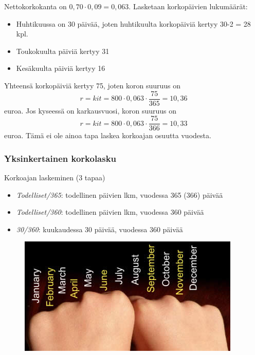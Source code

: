 \documentclass{beamer}
\begin{document}
\begin{frame}
    \begin{ratkaisu}
        Nettokorkokanta on \(0,70\cdot0,09 = 0,063\). Lasketaan korkopäivien lukumäärät:
        \begin{itemize}
            \item Huhtikuussa on 30 päivää, joten huhtikuulta korkopäiviä kertyy 30-2 = 28 kpl.
            \item Toukokuulta päiviä kertyy 31
            \item Kesäkuulta päiviä kertyy 16
        \end{itemize}
        Yhteensä korkopäiviä kertyy 75, joten koron suuruus on
        \[
            r = kit = 800\cdot 0,063\cdot \frac{75}{365} = 10,36
        \]
        euroa. Jos kyseessä on karkausvuosi, koron suuruus on
        \[
            r = kit = 800\cdot 0,063\cdot \frac{75}{366} = 10,33
        \]
        euroa. Tämä ei ole ainoa tapa laskea korkoajan osuutta vuodesta.
    \end{ratkaisu}
\end{frame}

\begin{frame}
    \frametitle{Yksinkertainen korkolasku}
    \begin{block}{Korkoajan laskeminen (3 tapaa)}
        \begin{itemize}
            \item \emph{Todelliset/365}: todellinen päivien lkm, vuodessa 365 (366) päivää
            \item \emph{Todelliset/360}: todellinen päivien lkm, vuodessa 360 päivää
            \item \emph{30/360}: kuukaudessa 30 päivää, vuodessa 360 päivää
        \end{itemize}
    \end{block}
    \begin{figure}
        \includegraphics[scale=0.7]{months}
    \end{figure}
\end{frame}
\end{document}
